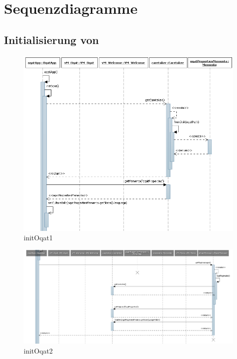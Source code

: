 \chapter {Sequenzdiagramme}
\section{Initialisierung von \projektTitel}
\begin{figure}[H]
\includegraphics[width=\linewidth]{bilder/Sequenzdiagramm/initOqat1.png}
\caption{initOqat1}
\end{figure}

\begin{figure}[H]
\includegraphics[width=\linewidth]{bilder/Sequenzdiagramm/initOqat2.png}
\caption{initOqat2}
\end{figure}

